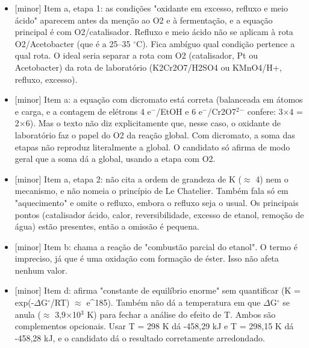 \documentclass{article}%
\begin{document}
\begin{itemize}%
\item%
{[}minor{]} Item a, etapa 1: as condições "oxidante em excesso, refluxo e meio ácido" aparecem antes da menção ao O2 e à fermentação, e a equação principal é com O2/catalisador. Refluxo e meio ácido não se aplicam à rota O2/Acetobacter (que é a 25--35 $^\circ$C). Fica ambíguo qual condição pertence a qual rota. O ideal seria separar a rota com O2 (catalisador, Pt ou Acetobacter) da rota de laboratório (K2Cr2O7/H2SO4 ou KMnO4/H+, refluxo, excesso).%
\item%
{[}minor{]} Item a: a equação com dicromato está correta (balanceada em átomos e carga, e a contagem de elétrons 4 e$^{-}$/EtOH e 6 e$^{-}$/Cr2O7$^2$$^{-}$ confere: 3$\times$4 = 2$\times$6). Mas o texto não diz explicitamente que, nesse caso, o oxidante de laboratório faz o papel do O2 da reação global. Com dicromato, a soma das etapas não reproduz literalmente a global. O candidato só afirma de modo geral que a soma dá a global, usando a etapa com O2.%
\item%
{[}minor{]} Item a, etapa 2: não cita a ordem de grandeza de K ($\approx$ 4) nem o mecanismo, e não nomeia o princípio de Le Chatelier. Também fala só em "aquecimento" e omite o refluxo, embora o refluxo seja o usual. Os principais pontos (catalisador ácido, calor, reversibilidade, excesso de etanol, remoção de água) estão presentes, então a omissão é pequena.%
\item%
{[}minor{]} Item b: chama a reação de "combustão parcial do etanol". O termo é impreciso, já que é uma oxidação com formação de éster. Isso não afeta nenhum valor.%
\item%
{[}minor{]} Item d: afirma "constante de equilíbrio enorme" sem quantificar (K = exp(-$\Delta$G$^\circ$/RT) $\approx$ e\^{}185). Também não dá a temperatura em que $\Delta$G$^\circ$ se anula ($\approx$ 3,9$\times$10$^3$ K) para fechar a análise do efeito de T. Ambos são complementos opcionais. Usar T = 298 K dá -458,29 kJ e T = 298,15 K dá -458,28 kJ, e o candidato dá o resultado corretamente arredondado.%
\end{itemize}%
\end{document}

